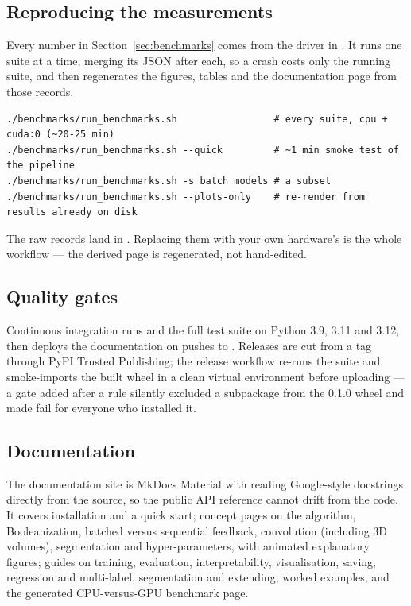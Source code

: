 \subsection{Reproducing the measurements}

Every number in Section~\ref{sec:benchmarks} comes from the driver in . It
runs one suite at a time, merging its JSON after each, so a crash costs only the running
suite, and then regenerates the figures, tables and the documentation page from those records.

\begin{lstlisting}[style=ttshell]
./benchmarks/run_benchmarks.sh                 # every suite, cpu + cuda:0 (~20-25 min)
./benchmarks/run_benchmarks.sh --quick         # ~1 min smoke test of the pipeline
./benchmarks/run_benchmarks.sh -s batch models # a subset
./benchmarks/run_benchmarks.sh --plots-only    # re-render from results already on disk
\end{lstlisting}

The raw records land in . Replacing them with your
own hardware's is the whole workflow --- the derived page is regenerated, not hand-edited.

\subsection{Quality gates}

Continuous integration runs  and the full test suite on Python 3.9, 3.11 and 3.12,
then deploys the documentation on pushes to . Releases are cut from a 
tag through PyPI Trusted Publishing; the release workflow re-runs the suite and smoke-imports
the built wheel in a clean virtual environment before uploading --- a gate added after a
 rule silently excluded a subpackage from the 0.1.0 wheel and made
 fail for everyone who installed it.

\subsection{Documentation}

The documentation site is MkDocs Material with  reading Google-style
docstrings directly from the source, so the public API reference cannot drift from the code.
It covers installation and a quick start; concept pages on the algorithm, Booleanization,
batched versus sequential feedback, convolution (including 3D volumes), segmentation and
hyper-parameters, with animated explanatory figures; guides on training, evaluation,
interpretability, visualisation, saving, regression and multi-label, segmentation and
extending; worked examples; and the generated CPU-versus-GPU benchmark page.

